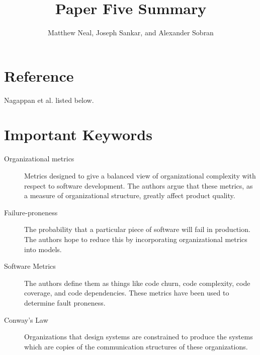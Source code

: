 \documentclass[english]{article}
\begin{document}
\title{Paper Five Summary}


\author{Matthew Neal, Joseph Sankar, and Alexander Sobran}

\maketitle

\section*{Reference}

Nagappan et al. \cite{Nagappan} listed below.


\section*{Important Keywords}
\begin{description}
\item [{Organizational metrics}] Metrics designed to give a balanced view of organizational complexity with respect to software development. The authors argue that these metrics, as a measure of organizational structure, greatly affect product quality.
\item[{Failure-proneness}] The probability that a particular piece of software will fail in production. The authors hope to reduce this by incorporating organizational metrics into models.
\item[{Software Metrics}]  The authors define them as things like code churn, code complexity, code coverage, and code dependencies.  These metrics have been used to determine fault proneness.
\item[{Conway's Law}] Organizations that design systems are constrained to produce the systems which are copies of the communication structures of these organizations.

\end{description}
\end{document}

